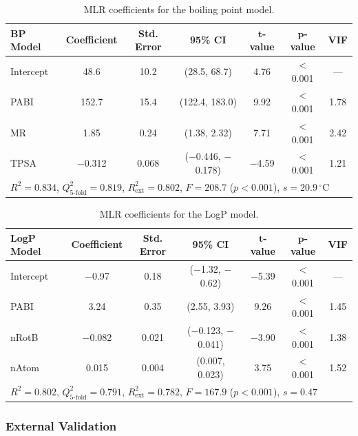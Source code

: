\documentclass[12pt,a4paper]{article}
\begin{document}
\begin{table}[H]
\centering
\caption{MLR coefficients for the boiling point model.}
\label{tab:mlr_bp}
\begin{tabular}{@{}lcccccc@{}}
\toprule
\textbf{BP Model} & \textbf{Coefficient} & \textbf{Std. Error} & \textbf{95\% CI} & $\mathbf{t}$-\textbf{value} & $\mathbf{p}$-\textbf{value} & \textbf{VIF} \\
\midrule
Intercept & 48.6 & 10.2 & (28.5, 68.7) & 4.76 & $<$0.001 & --- \\
PABI & 152.7 & 15.4 & (122.4, 183.0) & 9.92 & $<$0.001 & 1.78 \\
MR & 1.85 & 0.24 & (1.38, 2.32) & 7.71 & $<$0.001 & 2.42 \\
TPSA & $-$0.312 & 0.068 & ($-$0.446, $-$0.178) & $-$4.59 & $<$0.001 & 1.21 \\
\midrule
\multicolumn{7}{l}{$R^2 = 0.834$, $Q^2_{5\text{-fold}} = 0.819$, $R^2_{\text{ext}} = 0.802$, $F = 208.7$ ($p < 0.001$), $s = 20.9\,^{\circ}\text{C}$} \\
\bottomrule
\end{tabular}
\end{table}

\begin{table}[H]
\centering
\caption{MLR coefficients for the LogP model.}
\label{tab:mlr_logp}
\begin{tabular}{@{}lcccccc@{}}
\toprule
\textbf{LogP Model} & \textbf{Coefficient} & \textbf{Std. Error} & \textbf{95\% CI} & $\mathbf{t}$-\textbf{value} & $\mathbf{p}$-\textbf{value} & \textbf{VIF} \\
\midrule
Intercept & $-$0.97 & 0.18 & ($-$1.32, $-$0.62) & $-$5.39 & $<$0.001 & --- \\
PABI & 3.24 & 0.35 & (2.55, 3.93) & 9.26 & $<$0.001 & 1.45 \\
nRotB & $-$0.082 & 0.021 & ($-$0.123, $-$0.041) & $-$3.90 & $<$0.001 & 1.38 \\
nAtom & 0.015 & 0.004 & (0.007, 0.023) & 3.75 & $<$0.001 & 1.52 \\
\midrule
\multicolumn{7}{l}{$R^2 = 0.802$, $Q^2_{5\text{-fold}} = 0.791$, $R^2_{\text{ext}} = 0.782$, $F = 167.9$ ($p < 0.001$), $s = 0.47$} \\
\bottomrule
\end{tabular}
\end{table}

\subsubsection{External Validation}
\end{document}
